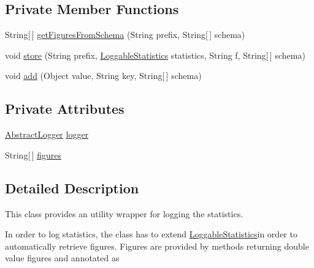 \subsection*{Private Member Functions}
\begin{DoxyCompactItemize}
\item 
String\mbox{[}$\,$\mbox{]} \hyperlink{classjenes_1_1statistics_1_1_statistics_logger_a2644fe91ad8cbd906f080d29c357990e}{get\-Figures\-From\-Schema} (String prefix, String\mbox{[}$\,$\mbox{]} schema)
\item 
void \hyperlink{classjenes_1_1statistics_1_1_statistics_logger_aecd5866bd413f3f9260603c885de1985}{store} (String prefix, \hyperlink{classjenes_1_1statistics_1_1_statistics_logger_1_1_loggable_statistics}{Loggable\-Statistics} statistics, String f, String\mbox{[}$\,$\mbox{]} schema)
\item 
void \hyperlink{classjenes_1_1statistics_1_1_statistics_logger_ab6f709ff2b69c85882208d04beea40f7}{add} (Object value, String key, String\mbox{[}$\,$\mbox{]} schema)
\end{DoxyCompactItemize}
\subsection*{Private Attributes}
\begin{DoxyCompactItemize}
\item 
\hyperlink{classjenes_1_1utils_1_1_abstract_logger}{Abstract\-Logger} \hyperlink{classjenes_1_1statistics_1_1_statistics_logger_a8b3fff50891ab6715773b1e71dbfe30d}{logger}
\item 
String\mbox{[}$\,$\mbox{]} \hyperlink{classjenes_1_1statistics_1_1_statistics_logger_a294b6a4c271f4cbc935792d99bd284b3}{figures}
\end{DoxyCompactItemize}


\subsection{Detailed Description}
This class provides an utility wrapper for logging the statistics.

In order to log statistics, the class has to extend {\ttfamily \hyperlink{classjenes_1_1statistics_1_1_statistics_logger_1_1_loggable_statistics}{Loggable\-Statistics}{\ttfamily  in order to automatically retrieve figures. Figures are provided by methods returning {\ttfamily double} value figures and annotated as {}}}

